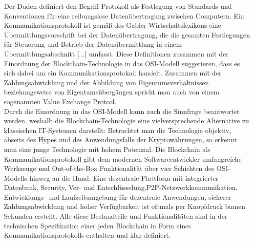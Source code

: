 Der Duden \cite{Duden2006} definiert den Begriff Protokoll als \glqq Festlegung von Standards und Konventionen für eine reibungslose Datenübertragung zwischen Computern\grqq. Ein Kommunikationsprotokoll ist gemäß des Gabler Wirtschaftslexikons \cite{Gabler2004} \glqq eine Übermittlungsvorschrift bei der Datenübertragung, die die gesamten Festlegungen für Steuerung und Betrieb der Datenübermittlung in einem Übermittlungsabschnitt [...] umfasst\grqq. Diese Definitionen zusammen mit der Einordnung der Blockchain-Technologie in das \ac{OSI}-Modell suggerieren, dass es sich dabei um ein Kommunikationsprotokoll handelt. Zusammen mit der Zahlungsabwicklung und der Abbildung von Eigentumsverhältnissen beziehungsweise von Eigentumsübergängen spricht man auch von einem sogenannten \glqq Value Exchange Protcol\grqq \cite{bheemaiah2015}.\\
Durch die Einordnung in das \ac{OSI}-Modell kann auch die Sinnfrage beantwortet werden, weshalb die Blockchain-Technologie eine vielversprechende Alternative zu klassischen IT-Systemen darstellt: Betrachtet man die Technologie objektiv, abseits des Hypes und des Anwendungsfalls der Kryptowährungen, so erkennt man eine junge Technologie mit hohem Potenzial. Die Blockchain als Kommunikationsprotokoll gibt dem modernen Softwareentwickler umfangreiche Werkzeuge und Out-of-the-Box Funktionalität über vier Schichten des \ac{OSI}-Modells hinweg an die Hand. Eine dezentrale Plattform mit integrierter Datenbank, Security, Ver- und Entschlüsselung,\ac{P2P}-Netzwerkkommunikation, Entwicklungs- und Laufzeitumgebung für dezentrale Anwendungen, sicherer Zahlungsabwicklung und hoher Verfügbarkeit ist oftmals per Knopfdruck binnen Sekunden erstellt. Alle diese Bestandteile und Funktionalitäten sind in der technischen Spezifikation einer jeden Blockchain in Form eines Kommunikationsprotokolls enthalten und klar definiert.


%
%
